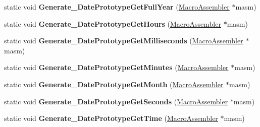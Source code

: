 \begin{DoxyCompactItemize}
\item 
static void {\bfseries Generate\+\_\+\+Date\+Prototype\+Get\+Full\+Year} (\hyperlink{classv8_1_1internal_1_1_macro_assembler}{Macro\+Assembler} $\ast$masm)\hypertarget{classv8_1_1internal_1_1_builtins_afb66b8d412b6949ebe0ed84a8018346b}{}\label{classv8_1_1internal_1_1_builtins_afb66b8d412b6949ebe0ed84a8018346b}

\item 
static void {\bfseries Generate\+\_\+\+Date\+Prototype\+Get\+Hours} (\hyperlink{classv8_1_1internal_1_1_macro_assembler}{Macro\+Assembler} $\ast$masm)\hypertarget{classv8_1_1internal_1_1_builtins_a94c0766b261b754771f3abb596639462}{}\label{classv8_1_1internal_1_1_builtins_a94c0766b261b754771f3abb596639462}

\item 
static void {\bfseries Generate\+\_\+\+Date\+Prototype\+Get\+Milliseconds} (\hyperlink{classv8_1_1internal_1_1_macro_assembler}{Macro\+Assembler} $\ast$masm)\hypertarget{classv8_1_1internal_1_1_builtins_a27fab6547b81a4352ddf3b6ac6c0fe82}{}\label{classv8_1_1internal_1_1_builtins_a27fab6547b81a4352ddf3b6ac6c0fe82}

\item 
static void {\bfseries Generate\+\_\+\+Date\+Prototype\+Get\+Minutes} (\hyperlink{classv8_1_1internal_1_1_macro_assembler}{Macro\+Assembler} $\ast$masm)\hypertarget{classv8_1_1internal_1_1_builtins_aed5ffc436c9c2bb83635173091c8183d}{}\label{classv8_1_1internal_1_1_builtins_aed5ffc436c9c2bb83635173091c8183d}

\item 
static void {\bfseries Generate\+\_\+\+Date\+Prototype\+Get\+Month} (\hyperlink{classv8_1_1internal_1_1_macro_assembler}{Macro\+Assembler} $\ast$masm)\hypertarget{classv8_1_1internal_1_1_builtins_a0d21ab27d547ad11760a692b36ca40a9}{}\label{classv8_1_1internal_1_1_builtins_a0d21ab27d547ad11760a692b36ca40a9}

\item 
static void {\bfseries Generate\+\_\+\+Date\+Prototype\+Get\+Seconds} (\hyperlink{classv8_1_1internal_1_1_macro_assembler}{Macro\+Assembler} $\ast$masm)\hypertarget{classv8_1_1internal_1_1_builtins_a1de39eb039beb275e0087add300c9337}{}\label{classv8_1_1internal_1_1_builtins_a1de39eb039beb275e0087add300c9337}

\item 
static void {\bfseries Generate\+\_\+\+Date\+Prototype\+Get\+Time} (\hyperlink{classv8_1_1internal_1_1_macro_assembler}{Macro\+Assembler} $\ast$masm)\hypertarget{classv8_1_1internal_1_1_builtins_a8396b929a442a0891ca2be5a137dee0f}{}\label{classv8_1_1internal_1_1_builtins_a8396b929a442a0891ca2be5a137dee0f}


\end{DoxyCompactItemize}
